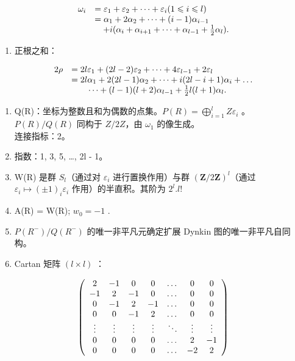 \[
\begin{array}{r l} \omega_ {i} & = \varepsilon_ {1} + \varepsilon_ {2} + \dots + \varepsilon_ {i} (1 \leqslant i \leqslant l) \\ & = \alpha_ {1} + 2 \alpha_ {2} + \dots + (i - 1) \alpha_ {i - 1} \\ & \quad + i (\alpha_ {i} + \alpha_ {i + 1} + \dots + \alpha_ {l - 1} + \frac {1}{2} \alpha_ {l}). \end{array}
\]

\begin{enumerate}
\def\labelenumi{(\Roman{enumi})}
\setcounter{enumi}{6}
\tightlist
\item
  正根之和：
\end{enumerate}

\[
\begin{array}{r l} 2 \rho & = 2 l \varepsilon_ {1} + (2 l - 2) \varepsilon_ {2} + \dots + 4 \varepsilon_ {l - 1} + 2 \varepsilon_ {l} \\ & = 2 l \alpha_ {1} + 2 (2 l - 1) \alpha_ {2} + \dots + i (2 l - i + 1) \alpha_ {i} + \dots \\ & \qquad \dots + (l - 1) (l + 2) \alpha_ {l - 1} + \frac {1}{2} l (l + 1) \alpha_ {l}. \end{array}
\]

\begin{enumerate}
\def\labelenumi{(\Roman{enumi})}
\setcounter{enumi}{7}
\item
  Q(R)：坐标为整数且和为偶数的点集。\(P(R) = \bigoplus_{i=1}^{l} Z \varepsilon_i\) 。\(P(R)/Q(R)\) 同构于 \(Z/2Z\)，由 \(\omega_1\) 的像生成。\\
  连接指标：2。
\item
  指数：1, 3, 5, \ldots, 2l - 1。
\item
  W(R) 是群 \(S_{l}\)（通过对 \(\varepsilon_{i}\) 进行置换作用）与群 \((\mathbf{Z}/2\mathbf{Z})^{l}\)（通过 \(\varepsilon_{i} \mapsto (\pm1)_{i}\varepsilon_{i}\) 作用）的半直积。其阶为 \(2^{l}.l!\)
\item
  A(R) = W(R); \(w_{0} = -1\) .
\item
  \(P(R^{-})/Q(R^{-})\) 的唯一非平凡元确定扩展 Dynkin 图的唯一非平凡自同构。
\item
  Cartan 矩阵 \((l\times l)\) ：
\end{enumerate}

\[
\left( \begin{array}{c c c c c c c} 2 & - 1 & 0 & 0 & \dots & 0 & 0 \\ - 1 & 2 & - 1 & 0 & \dots & 0 & 0 \\ 0 & - 1 & 2 & - 1 & \dots & 0 & 0 \\ 0 & 0 & - 1 & 2 & \dots & 0 & 0 \\ \vdots & \vdots & \vdots & \vdots & \ddots & \vdots & \vdots \\ 0 & 0 & 0 & 0 & \dots & 2 & - 1 \\ 0 & 0 & 0 & 0 & \dots & - 2 & 2 \end{array} \right)
\]


